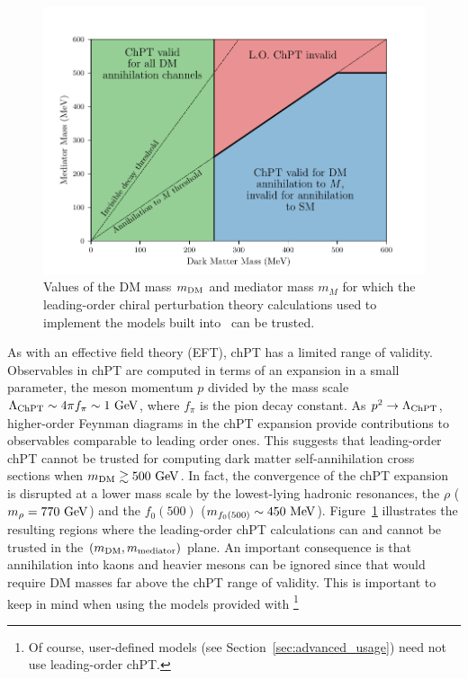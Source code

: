 \begin{figure}
    \centering
    \includegraphics[width=\linewidth]{figures/med_and_dm_mass_phase_diagram.pdf}
    \caption{Values of the DM mass $m_{\mathrm{DM}}$ and mediator mass $m_M$ for which the leading-order chiral perturbation theory calculations used to implement the models built into \hazma\ can be trusted.}
    \label{fig:chpt_validity}
\end{figure}

As with an effective field theory (EFT), chPT has a limited range of validity. Observables in chPT are computed in terms of an expansion in a small parameter, the meson momentum $p$ divided by the mass scale $\Lambda_{\mathrm{ChPT}} \sim 4 \pi f_\pi \sim 1{~\mathrm{GeV}}$, where $f_\pi$ is the pion decay constant. As $p^2 \to \Lambda_{\mathrm{ChPT}}$, higher-order Feynman diagrams in the chPT expansion provide contributions to observables comparable to leading order ones. This suggests that leading-order chPT cannot be trusted for computing dark matter self-annihilation cross sections when $m_{\mathrm{DM}} \gtrsim 500{~\mathrm{GeV}}$. In fact, the convergence of the chPT expansion is disrupted at a lower mass scale by the lowest-lying hadronic resonances, the $\rho$ ($m_\rho = 770{~\mathrm{GeV}}$) and the $f_0(500)$ ($m_{f_0(500)} \sim 450{~\mathrm{MeV}}$). Figure~\ref{fig:chpt_validity} illustrates the resulting regions where the leading-order chPT calculations can and cannot be trusted in the $(m_{\mathrm{DM}}, m_{\mathrm{mediator}})$ plane. An important consequence is that annihilation into kaons and heavier mesons can be ignored since that would require DM masses far above the chPT range of validity. This is important to keep in mind when using the models provided with \hazma\.\footnote{Of course, user-defined models (see Section~\ref{sec:advanced_usage}) need not use leading-order chPT.}

